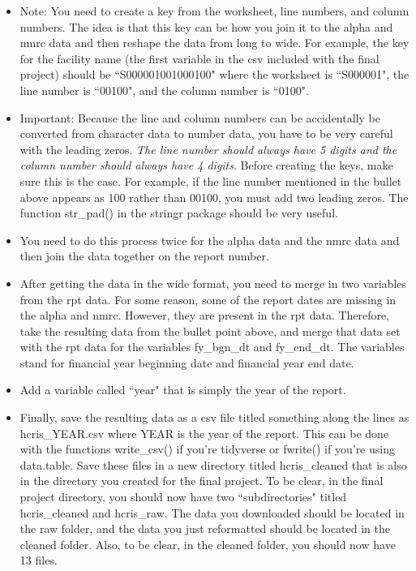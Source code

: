 \documentclass{article}
\begin{document}
\begin{itemize}
	\item Note: You need to create a key from the worksheet, line numbers, and column numbers. The idea is that this key can be how you join it to the alpha and nmrc data and then reshape the data from long to wide. For example, the key for the facility name (the first variable in the csv included with the final project) should be ``S000001001000100" where the worksheet is ``S000001", the line number is ``00100", and the column number is ``0100".
	\item Important: Because the line and column numbers can be accidentally be converted from character data to number data, you have to be very careful with the leading zeros.  \textit{The line number should always have 5 digits and the column number should always have 4 digits}. Before creating the keys, make sure this is the case. For example, if the line number mentioned in the bullet above appears as 100 rather than 00100, you must add two leading zeros. The function str\_pad() in the stringr package should be very useful.
	\item You need to do this process twice for the alpha data and the nmrc data and then join the data together on the report number.
	\item After getting the data in the wide format, you need to merge in two variables from the rpt data. For some reason, some of the report dates are missing in the alpha and nmrc. However, they are present in the rpt data. Therefore, take the resulting data from the bullet point above, and merge that data set with the rpt data for the variables fy\_bgn\_dt and fy\_end\_dt. The variables stand for financial year beginning date and financial year end date.
	\item Add a variable called ``year" that is simply the year of the report.
	\item Finally, save the resulting data as a csv file titled something along the lines as hcris\_YEAR.csv where YEAR is the year of the report. This can be done with the functions write\_csv() if you're tidyverse or fwrite() if you're using data.table. Save these files in a new directory titled hcris\_cleaned that is also in the directory you created for the final project. To be clear, in the final project directory, you should now have two ``subdirectories" titled hcris\_cleaned and hcris\_raw. The data you downloaded should be located in the raw folder, and the data you just reformatted should be located in the cleaned folder. Also, to be clear, in the cleaned folder, you should now have 13 files.
	\end{itemize}
	
\end{document}
